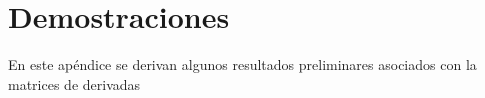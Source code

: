 \chapter{Demostraciones}\label{appA}

En este ap\'endice se derivan algunos resultados preliminares asociados con la matrices de derivadas 

